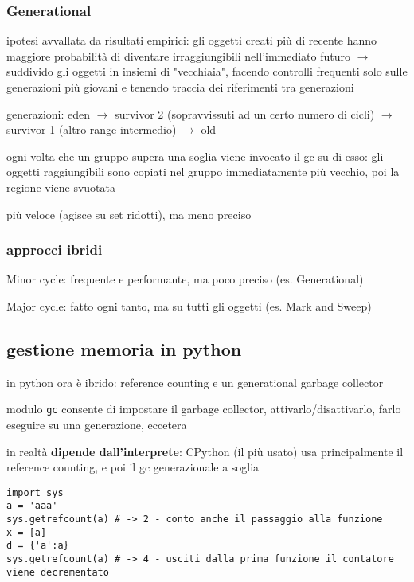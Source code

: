 \subsubsection{Generational}

ipotesi avvallata da risultati empirici: gli oggetti creati pi\`u di recente hanno maggiore probabilit\`a di diventare irraggiungibili nell'immediato futuro $\rightarrow$ suddivido gli oggetti in insiemi di "vecchiaia", facendo controlli frequenti solo sulle generazioni pi\`u giovani e tenendo traccia dei riferimenti tra generazioni

generazioni: eden $\rightarrow$ survivor 2 (sopravvissuti ad un certo numero di cicli) $\rightarrow$ survivor 1 (altro range intermedio) $\rightarrow$ old

ogni volta che un gruppo supera una soglia viene invocato il gc su di esso: gli oggetti raggiungibili sono copiati nel gruppo immediatamente pi\`u vecchio, poi la regione viene svuotata

pi\`u veloce (agisce su set ridotti), ma meno preciso

\subsubsection{approcci ibridi}

Minor cycle: frequente e performante, ma poco preciso (es. Generational)

Major cycle: fatto ogni tanto, ma su tutti gli oggetti (es. Mark and Sweep)

\subsection{gestione memoria in python}

in python ora \`e ibrido: reference counting e un generational garbage collector

modulo \texttt{gc} consente di impostare il garbage collector, attivarlo/disattivarlo, farlo eseguire su una generazione, eccetera

in realt\`a \textbf{dipende dall'interprete}: CPython (il pi\`u usato) usa principalmente il reference counting, e poi il gc generazionale a soglia

\begin{verbatim}
import sys
a = 'aaa'
sys.getrefcount(a) # -> 2 - conto anche il passaggio alla funzione
x = [a]
d = {'a':a}
sys.getrefcount(a) # -> 4 - usciti dalla prima funzione il contatore viene decrementato
\end{verbatim}

